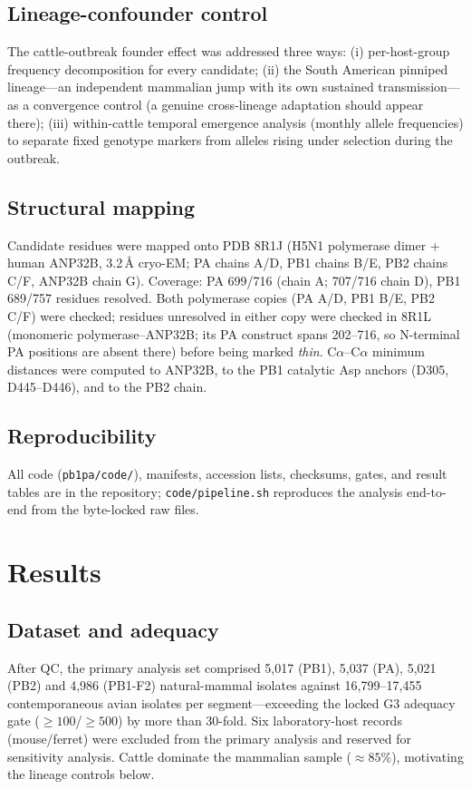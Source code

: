 \documentclass[11pt]{article}
\begin{document}
\subsection{Lineage-confounder control}
The cattle-outbreak founder effect was addressed three ways: (i) per-host-group frequency decomposition for every candidate; (ii) the South American pinniped lineage---an independent mammalian jump with its own sustained transmission---as a convergence control (a genuine cross-lineage adaptation should appear there); (iii) within-cattle temporal emergence analysis (monthly allele frequencies) to separate fixed genotype markers from alleles rising under selection during the outbreak.
\subsection{Structural mapping}
Candidate residues were mapped onto PDB 8R1J (H5N1 polymerase dimer + human ANP32B, 3.2\,\AA{} cryo-EM; PA chains A/D, PB1 chains B/E, PB2 chains C/F, ANP32B chain G). Coverage: PA 699/716 (chain A; 707/716 chain D), PB1 689/757 residues resolved. Both polymerase copies (PA A/D, PB1 B/E, PB2 C/F) were checked; residues unresolved in either copy were checked in 8R1L (monomeric polymerase--ANP32B; its PA construct spans 202--716, so N-terminal PA positions are absent there) before being marked \emph{thin}. C$\alpha$--C$\alpha$ minimum distances were computed to ANP32B, to the PB1 catalytic Asp anchors (D305, D445--D446), and to the PB2 chain.
\subsection{Reproducibility}
All code (\texttt{pb1pa/code/}), manifests, accession lists, checksums, gates, and result tables are in the repository; \texttt{code/pipeline.sh} reproduces the analysis end-to-end from the byte-locked raw files.
\section{Results}
\subsection{Dataset and adequacy}
After QC, the primary analysis set comprised 5,017 (PB1), 5,037 (PA), 5,021 (PB2) and 4,986 (PB1-F2) natural-mammal isolates against 16,799--17,455 contemporaneous avian isolates per segment---exceeding the locked G3 adequacy gate ($\geq100$/$\geq500$) by more than 30-fold. Six laboratory-host records (mouse/ferret) were excluded from the primary analysis and reserved for sensitivity analysis. Cattle dominate the mammalian sample ($\approx85\%$), motivating the lineage controls below.
\end{document}
